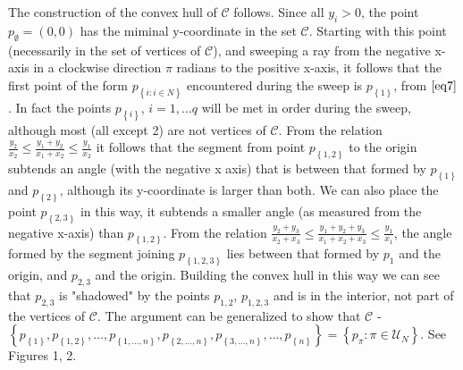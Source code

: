 \documentclass{article}
\theoremstyle{case}
\begin{document}
The construction of the convex hull of $\mathcal{C}$ follows. Since all $y_i > 0$, the point $p_{\emptyset} = \left(0,0\right)$ has the miminal y-coordinate in the set $\mathcal{C}$. Starting with this point (necessarily in the set of vertices of $\mathcal{C}$), and sweeping a ray from the negative x-axis in a clockwise direction $\pi$ radians to the positive x-axis, it follows that the first point of the form $p_{\left\lbrace i \colon i \in N\right\rbrace}$ encountered during the sweep is $p_{\left\lbrace 1 \right\rbrace}$, from $\ref{eq7}$. In fact the points $p_{\left\lbrace i \right\rbrace}$, $i =1, \dots q$ will be met in order during the sweep, although most (all except 2) are not vertices of $\mathcal{C}$. From the relation $\frac{y_2}{x_2} \leq \frac{y_1+y_2}{x_1+x_2} \leq \frac{y_1}{x_2}$ it follows that the segment from point $p_{\left\lbrace 1,2 \right\rbrace}$ to the origin subtends an angle (with the negative x axis) that is between that formed by $p_{\left\lbrace 1 \right\rbrace}$ and $p_{\left\lbrace 2 \right\rbrace}$, although its y-coordinate is larger than both. We can also place the point $p_{\left\lbrace 2,3 \right\rbrace}$ in this way, it subtends a smaller angle (as measured from the negative x-axis) than $p_{\left\lbrace 1,2 \right\rbrace}$. From the relation $\frac{y_2+y_3}{x_2+x_3} \leq \frac{y_1+y_2+y_3}{x_1+x_2+x_3} \leq \frac{y_1}{x_1}$, the angle formed by the segment joining $p_{\left\lbrace 1, 2, 3\right\rbrace}$ lies between that formed by $p_{1}$ and the origin, and $p_{2,3}$ and the origin. Building the convex hull in this way we can see that $p_{2,3}$ is "shadowed" by the points $p_{1,2}$, $p_{1,2,3}$ and is in the interior, not part of the vertices of $\mathcal{C}$. The argument can be generalized to show that $\mathcal{C}$ - $\left\lbrace p_{\left\lbrace 1\right\rbrace}, p_{\left\lbrace 1,2 \right\rbrace}, \dots, p_{\left\lbrace 1, \dots, n\right\rbrace}, p_{\left\lbrace 2, \dots, n\right\rbrace}, p_{\left\lbrace 3, \dots, n\right\rbrace}, \dots, p_{\left\lbrace n\right\rbrace}\right\rbrace = \left\lbrace p_{\pi} \colon \pi \in \mathcal{U}_N\right\rbrace$. See Figures 1, 2.
\end{document}
